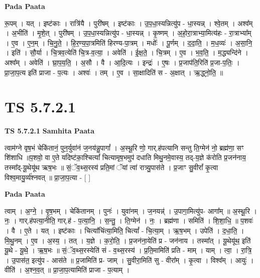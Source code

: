 \documentclass[17pt]{extarticle}
\begin{document}
\textbf{Pada Paata} \newline

रू॒पम् । यत् । इष्ट॑काः । रात्रि॑यै । पुरी॑षम् । इष्ट॑काः । उ॒प॒धा॒स्यन्नित्यु॑प - धा॒स्यन्न् । श्वे॒तम् । अश्व᳚म् । अ॒भीति॑ । मृ॒शे॒त् । पुरी॑षम् । उ॒प॒धा॒स्यन्नित्यु॑प - धा॒स्यन्न् । कृ॒ष्णम् । अ॒हो॒रा॒त्राभ्या॒मित्य॑हः - रा॒त्राभ्या᳚म् । ए॒व । ए॒न॒म् । चि॒नु॒ते॒ । हि॒र॒ण्य॒पा॒त्रमिति॑ हिरण्य-पा॒त्रम् । मधोः᳚ । पू॒र्णम् । द॒दा॒ति॒ । म॒ध॒व्यः॑ । अ॒सा॒नि॒ । इति॑ । सौ॒र्या । चि॒त्रव॒त्येति॑ चि॒त्र-व॒त्या॒ । अवेति॑ । ई॒क्ष॒ते॒ । चि॒त्रम् । ए॒व । भ॒व॒ति॒ । म॒द्ध्यन्दि॑ने । अश्व᳚म् । अवेति॑ । घ्रा॒प॒य॒ति॒ । अ॒सौ । वै । आ॒दि॒त्यः । इन्द्रः॑ । ए॒षः । प्र॒जाप॑ति॒रिति॑ प्र॒जा-प॒तिः॒ । प्रा॒जा॒प॒त्य इति॑ प्राजा - प॒त्यः । अश्वः॑ । तम् । ए॒व । सा॒क्षादिति॑ स - अ॒क्षात् । ऋ॒द्ध्नो॒ति॒ ॥  \newline





\section{ TS 5.7.2.1 }

\textbf{TS 5.7.2.1 } \newline
\textbf{Samhita Paata} \newline

त्वाम॑ग्ने वृष॒भं चेकि॑तानं॒ पुन॒र्युवा॑नं ज॒नय॑न्नु॒पागां᳚ । अ॒स्थू॒रि णो॒ गार्.ह॑पत्यानि सन्तु ति॒ग्मेन॑ नो॒ ब्रह्म॑णा॒ सꣳ शि॑शाधि ॥प॒शवो॒ वा ए॒ते यदिष्ट॑का॒श्चित्यां᳚ चित्यामृष॒भमुप॑ दधाति मिथु॒नमे॒वास्य॒ तद्-य॒ज्ञे क॑रोति प्र॒जन॑नाय॒ तस्मा᳚द्-यू॒थेयू॑थ ऋष॒भः ॥ सं॒ॅव॒थ्स॒रस्य॑ प्रति॒मां ॅयां त्वा॑ रात्र्यु॒पास॑ते । प्र॒जाꣳ सु॒वीरां᳚ कृ॒त्वा विश्व॒मायु॒र्व्य॑श्नवत् ॥ प्रा॒जा॒प॒त्या - [  ] \newline

\textbf{Pada Paata} \newline

त्वाम् । अ॒ग्ने॒ । वृ॒ष॒भम् । चेकि॑तानम् । पुनः॑ । युवा॑नम् । ज॒नयन्न्॑ । उ॒पागा॒मित्यु॑प- आगा᳚म् ॥ अ॒स्थू॒रि । नः॒ । गार्.ह॑पत्या॒नीति॒ गार्.ह॑ - प॒त्या॒नि॒ । स॒न्तु॒ । ति॒ग्मेन॑ । नः॒ । ब्रह्म॑णा । समिति॑ । शि॒शा॒धि॒ ॥ प॒शवः॑ । वै । ए॒ते । यत् । इष्ट॑काः । चित्या᳚चिंत्या॒मिति॒ चित्यां᳚ - चि॒त्या॒म् । ऋ॒ष॒भम् । उपेति॑ । द॒धा॒ति॒ । मि॒थु॒नम् । ए॒व । अ॒स्य॒ । तत् । य॒ज्ञे । क॒रो॒ति॒ । प्र॒जन॑ना॒येति॑ प्र - जन॑नाय । तस्मा᳚त् । यू॒थेयू॑थ॒ इति॑ यू॒थे - यू॒थे॒ । ऋ॒ष॒भः ॥ सं॒ॅव॒थ्स॒रस्येति॑ सं - व॒थ्स॒रस्य॑ । प्र॒ति॒मामिति॑ प्रति - माम् । याम् । त्वा॒ । रा॒त्रि॒ । उ॒पास॑त॒ इत्यु॑प - आस॑ते ॥ प्र॒जामिति॑ प्र- जाम् । सु॒वीरा॒मिति॑ सु - वीरा᳚म् । कृ॒त्वा । विश्व᳚म् । आयुः॑ । वीति॑ । अ॒श्न॒व॒त् ॥ प्रा॒जा॒प॒त्यामिति॑ प्राजा - प॒त्याम् ।  \newline
\end{document}
